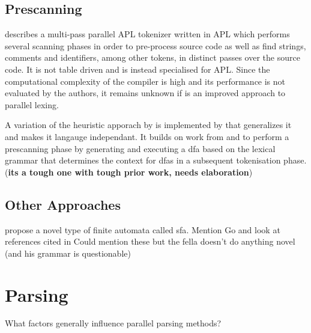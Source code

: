 \subsection{Prescanning} \label{lit_prescanning}

\cite{bernecky_spmdsimd_2003} describes a multi-pass parallel APL tokenizer
written in APL which performs several scanning phases in order to pre-process
source code as well as find strings, comments and identifiers, among other
tokens, in distinct passes over the source code. It is not table driven and is
instead specialised for APL. Since the computational complexity of the compiler
is high and its performance is not evaluated by the authors, it remains unknown
if is an improved approach to parallel lexing.

A variation of the heuristic apporach by \cite{barenghi_parallel_2015} is
implemented by \cite{li_plex_2021} that generalizes it and makes it langauge
independant. It builds on work from \cite{sinya_simultaneous_2013} and
\cite{zhao_--fly_2015} to perform a prescanning phase by generating and
executing a \gls{dfa} based on the lexical grammar that determines the context
for \glspl{dfa} in a subsequent tokenisation phase. (\textbf{its a tough one
with tough prior work, needs elaboration})


\subsection{Other Approaches}

\begin{roughwork}
\cite{sinya_simultaneous_2013} propose a novel type of finite automata called
\gls{sfa}.
\newline \newline
Mention \cite{lin_accelerating_2013, wang_hyperscan_2019,
li_plex_2021, asthagiri_associative_1992} Go and look at references cited in
\cite{zhao_--fly_2015}
\newline \newline
Could mention these but the fella doesn't do anything novel (and his
grammar is questionable) \cite{barve_parallel_2014, barve_parallel_2012,
barve_improved_2015}
\end{roughwork}

\section{Parsing} \label{lit_review_parsing}
\begin{sectionplan}
    What factors generally influence parallel parsing methods?
\end{sectionplan}

